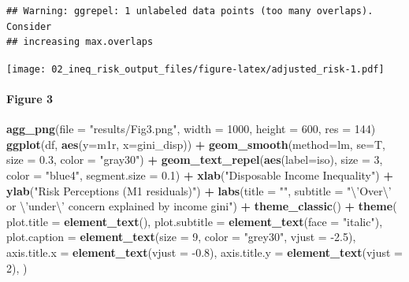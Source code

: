 \documentclass[
]{article}
\newenvironment{Shaded}{\begin{snugshade}}{\end{snugshade}}
\newcommand{\CharTok}[1]{\textcolor[rgb]{0.31,0.60,0.02}{#1}}
\newcommand{\DataTypeTok}[1]{\textcolor[rgb]{0.13,0.29,0.53}{#1}}
\newcommand{\DecValTok}[1]{\textcolor[rgb]{0.00,0.00,0.81}{#1}}
\newcommand{\FloatTok}[1]{\textcolor[rgb]{0.00,0.00,0.81}{#1}}
\newcommand{\KeywordTok}[1]{\textcolor[rgb]{0.13,0.29,0.53}{\textbf{#1}}}
\newcommand{\NormalTok}[1]{#1}
\newcommand{\OperatorTok}[1]{\textcolor[rgb]{0.81,0.36,0.00}{\textbf{#1}}}
\newcommand{\StringTok}[1]{\textcolor[rgb]{0.31,0.60,0.02}{#1}}
\begin{document}
\begin{verbatim}
## Warning: ggrepel: 1 unlabeled data points (too many overlaps). Consider
## increasing max.overlaps
\end{verbatim}

\texttt{[image: 02\_ineq\_risk\_output\_files/figure-latex/adjusted\_risk-1.pdf]}

\hypertarget{figure-3}{%
\paragraph{Figure 3}\label{figure-3}}

\begin{Shaded}
\begin{Highlighting}[]
\KeywordTok{agg_png}\NormalTok{(}\DataTypeTok{file =} \StringTok{"results/Fig3.png"}\NormalTok{, }\DataTypeTok{width =} \DecValTok{1000}\NormalTok{, }\DataTypeTok{height =} \DecValTok{600}\NormalTok{, }\DataTypeTok{res =} \DecValTok{144}\NormalTok{)}
\KeywordTok{ggplot}\NormalTok{(df, }\KeywordTok{aes}\NormalTok{(}\DataTypeTok{y=}\NormalTok{m1r, }\DataTypeTok{x=}\NormalTok{gini_disp)) }\OperatorTok{+}
\StringTok{  }\KeywordTok{geom_smooth}\NormalTok{(}\DataTypeTok{method=}\NormalTok{lm, }\DataTypeTok{se=}\NormalTok{T, }\DataTypeTok{size =} \FloatTok{0.3}\NormalTok{, }\DataTypeTok{color =} \StringTok{"gray30"}\NormalTok{) }\OperatorTok{+}
\StringTok{  }\KeywordTok{geom_text_repel}\NormalTok{(}\KeywordTok{aes}\NormalTok{(}\DataTypeTok{label=}\NormalTok{iso), }\DataTypeTok{size =} \DecValTok{3}\NormalTok{, }\DataTypeTok{color =} \StringTok{"blue4"}\NormalTok{, }\DataTypeTok{segment.size =} \FloatTok{0.1}\NormalTok{) }\OperatorTok{+}
\StringTok{  }\KeywordTok{xlab}\NormalTok{(}\StringTok{"Disposable Income Inequality"}\NormalTok{) }\OperatorTok{+}
\StringTok{  }\KeywordTok{ylab}\NormalTok{(}\StringTok{"Risk Perceptions (M1 residuals)"}\NormalTok{) }\OperatorTok{+}
\StringTok{  }\KeywordTok{labs}\NormalTok{(}\DataTypeTok{title =} \StringTok{""}\NormalTok{, }\DataTypeTok{subtitle =} \StringTok{"}\CharTok{\textbackslash{}'}\StringTok{Over}\CharTok{\textbackslash{}'}\StringTok{ or }\CharTok{\textbackslash{}'}\StringTok{under}\CharTok{\textbackslash{}'}\StringTok{ concern explained by income gini"}\NormalTok{) }\OperatorTok{+}
\StringTok{  }\KeywordTok{theme_classic}\NormalTok{() }\OperatorTok{+}\StringTok{ }
\StringTok{  }\KeywordTok{theme}\NormalTok{(}
  \DataTypeTok{plot.title =} \KeywordTok{element_text}\NormalTok{(),}
  \DataTypeTok{plot.subtitle =} \KeywordTok{element_text}\NormalTok{(}\DataTypeTok{face =} \StringTok{"italic"}\NormalTok{),}
  \DataTypeTok{plot.caption =} \KeywordTok{element_text}\NormalTok{(}\DataTypeTok{size =} \DecValTok{9}\NormalTok{, }\DataTypeTok{color =} \StringTok{"grey30"}\NormalTok{, }\DataTypeTok{vjust =} \FloatTok{-2.5}\NormalTok{),}
  \DataTypeTok{axis.title.x =} \KeywordTok{element_text}\NormalTok{(}\DataTypeTok{vjust =} \FloatTok{-0.8}\NormalTok{),}
  \DataTypeTok{axis.title.y =} \KeywordTok{element_text}\NormalTok{(}\DataTypeTok{vjust =} \DecValTok{2}\NormalTok{),}
\NormalTok{  )}
\end{Highlighting}
\end{Shaded}
\end{document}
